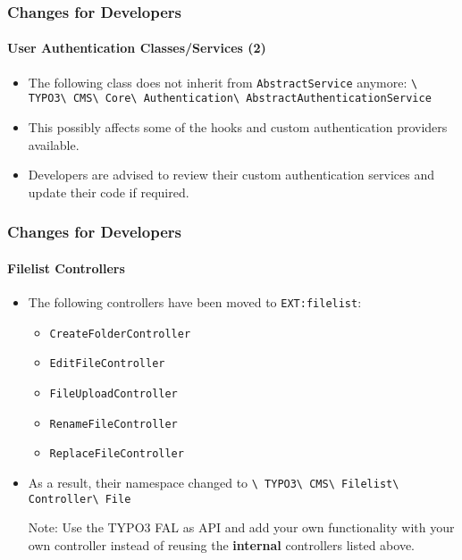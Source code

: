 \begin{frame}[fragile]
	\frametitle{Changes for Developers}
	\framesubtitle{User Authentication Classes/Services (2)}

	\begin{itemize}

		\item The following class does not inherit from
			\smaller\texttt{AbstractService}\normalsize\hspace{0.1cm}
			anymore:
			\smaller\texttt{\textbackslash
				TYPO3\textbackslash
				CMS\textbackslash
				Core\textbackslash
				Authentication\textbackslash
				AbstractAuthenticationService}\normalsize

		\item This possibly affects some of the hooks and custom authentication providers available.

		\item Developers are advised to review their custom authentication services and update
			their code if required.

	\end{itemize}

\end{frame}


\begin{frame}[fragile]
	\frametitle{Changes for Developers}
	\framesubtitle{Filelist Controllers}

	\begin{itemize}
		\item The following controllers have been moved to \texttt{EXT:filelist}:

			\begin{itemize}\small
				\item \texttt{CreateFolderController}
				\item \texttt{EditFileController}
				\item \texttt{FileUploadController}
				\item \texttt{RenameFileController}
				\item \texttt{ReplaceFileController}
			\end{itemize}\normalsize

		\item As a result, their namespace changed to\newline
			\texttt{\textbackslash
				TYPO3\textbackslash
				CMS\textbackslash
				Filelist\textbackslash
				Controller\textbackslash
				File}

		\vspace{0.2cm}

		\small
			Note: Use the TYPO3 FAL as API and add your own functionality
			with your own controller instead of reusing the \textbf{internal}
			controllers listed above.
		\normalsize

	\end{itemize}

\end{frame}

